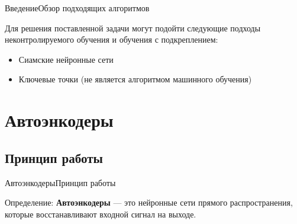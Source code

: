 \documentclass{beamer}
\begin{document}
\begin{frame}{Введение}{Обзор подходящих алгоритмов}

Для решения поставленной задачи могут подойти следующие подходы неконтролируемого обучения и обучения с подкреплением:
\begin{itemize}
\item Сиамские нейронные сети
\item Ключевые точки (не является алгоритмом машинного обучения)
\end{itemize}

\end{frame}

\section{Автоэнкодеры}

\subsection{Принцип работы}


\begin{frame}{Автоэнкодеры}{Принцип работы}

\begin{block}{Определение:}
\textbf{Автоэнкодеры} --- это нейронные сети прямого распространения, которые восстанавливают входной сигнал на выходе.
\end{block}

\begin{figure}[h]
\label{fig:ae}
\end{figure}

\end{frame}
\end{document}
